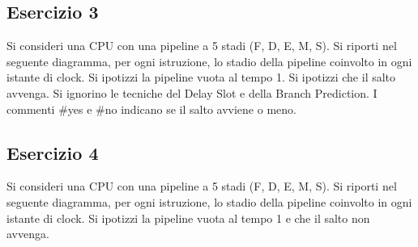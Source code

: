 \documentclass[a4paper]{article}
\theoremstyle{break}
\theoremstyle{break}
\theoremstyle{break}
\theoremstyle{break}
\begin{document}
\subsection{Esercizio 3}
Si consideri una CPU con una pipeline a 5 stadi (F, D, E, M, S). Si riporti nel seguente diagramma,
per ogni istruzione, lo stadio della pipeline coinvolto in ogni istante di clock. Si ipotizzi la pipeline
vuota al tempo 1. Si ipotizzi che il salto avvenga. Si ignorino le tecniche del Delay Slot e della
Branch Prediction. I commenti \#yes e \#no indicano se il salto avviene o meno.

\begin{table}[H]
  \centering
\end{table}

\subsection{Esercizio 4}
Si consideri una CPU con una pipeline a 5 stadi (F, D, E, M, S). Si riporti nel seguente diagramma,
per ogni istruzione, lo stadio della pipeline coinvolto in ogni istante di clock. Si ipotizzi la pipeline
vuota al tempo 1 e che il salto non avvenga.

\begin{table}[H]
  \centering
\end{table}
\end{document}
